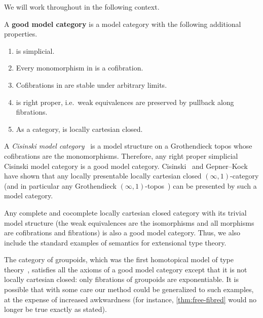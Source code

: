 \documentclass{amsart}
\begin{document}
We will work throughout in the following context.

\begin{defn}
  A \textbf{good model category} is a model category \sM with the following additional properties.
  \begin{enumerate}
  \item \sM is simplicial.\label{item:m0}
  \item Every monomorphism in \sM is a cofibration.\label{item:m1}
  \item Cofibrations in \sM are stable under arbitrary limits.\label{item:m1a}
  \item \sM is right proper, i.e.\ weak equivalences are preserved by pullback along fibrations.\label{item:m2}
  \item As a category, \sM is locally cartesian closed.\label{item:m3}
  \end{enumerate}
\end{defn}

\begin{eg}
A \emph{Cisinski model category}~\cite{cisinski:topos,cisinski:presheaves} is a model structure on a Grothendieck topos whose cofibrations are the monomorphisms.
Therefore, any right proper simplicial Cisinski model category is a good model category.
Cisinski~\cite{cisinski:lccc-rpcmc} and Gepner--Kock~\cite{gk:univlcc} have shown that any locally presentable locally cartesian closed $(\infty,1)$-category (and in particular any Grothendieck $(\infty,1)$-topos~\cite{lurie:higher-topoi}) can be presented by such a model category.
\end{eg}

\begin{eg}
Any complete and cocomplete locally cartesian closed category with its trivial model structure (the weak equivalences are the isomorphisms and all morphisms are cofibrations and fibrations) is also a good model category.
Thus, we also include the standard examples of semantics for extensional type theory.
\end{eg}

\begin{noneg}
The category of groupoids, which was the first homotopical model of type theory~\cite{hs:gpd-typethy}, satisfies all the axioms of a good model category except that it is not locally cartesian closed: only fibrations of groupoids are exponentiable.
It is possible that with some care our method could be generalized to such examples, at the expense of increased awkwardness (for instance, \cref{thm:free-fibred} would no longer be true exactly as stated).
\end{noneg}
\end{document}
